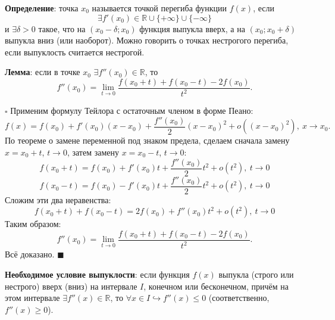 \documentclass[12pt, a4paper, reqno]{article}
\begin{document}
    \textbf{Определение}: точка $x_0$ называется точкой перегиба функции $f(x)$, если
    \begin{equation*}
        \exists f'(x_0)\in\mathbb{R}\cup\{+\infty\}\cup\{-\infty\}
    \end{equation*}
    и $\exists\delta > 0$ такое, что на $(x_0 - \delta; x_0)$ функция выпукла вверх, а на
    $(x_0; x_0 + \delta)$ выпукла вниз (или наоборот). Можно говорить о точках нестрогого перегиба,
    если выпуклость считается нестрогой.

    \textbf{Лемма}: если в точке $x_0$ $\exists f''(x_0)\in\mathbb{R}$, то
    \begin{equation*}
        f''(x_0) = \lim\limits_{t\to 0} \dfrac{f(x_0 + t) + f(x_0 - t) - 2f(x_0)}{t^2}.
    \end{equation*}

    $\square$ Применим формулу Тейлора с остаточным членом в форме Пеано:
    \begin{equation*}
        f(x) = f(x_0) + f'(x_0)(x - x_0) + \dfrac{f''(x_0)}{2}(x - x_0)^2 + o\left((x - x_0)^2\right),\
        x\to x_0.
    \end{equation*}
    По теореме о замене переменной под знаком предела, сделаем сначала замену $x = x_0 + t$,
    $t\to 0$, затем замену $x = x_0 - t$, $t\to 0$:
    \begin{equation*}
        f(x_0 + t) = f(x_0) + f'(x_0)t + \dfrac{f''(x_0)}{2}t^2 + o(t^2),\ t\to 0
    \end{equation*}
    \begin{equation*}
        f(x_0 - t) = f(x_0) - f'(x_0)t + \dfrac{f''(x_0)}{2}t^2 + o(t^2),\ t\to 0
    \end{equation*}
    Сложим эти два неравенства:
    \begin{equation*}
        f(x_0 + t) + f(x_0 - t) = 2f(x_0) + f''(x_0)t^2 + o(t^2),\ t\to 0
    \end{equation*}
    Таким образом:
    \begin{equation*}
        f''(x_0) = \lim\limits_{t\to 0} \dfrac{f(x_0 + t) + f(x_0 - t) - 2f(x_0)}{t^2}.
    \end{equation*}
    Всё доказано. $\blacksquare$

    \textbf{Необходимое условие выпуклости}: если функция $f(x)$ выпукла (строго или нестрого) вверх
    (вниз) на интервале $I$, конечном или бесконечном, причём на этом интервале
    $\exists f''(x)\in\mathbb{R}$, то $\forall x\in I\hookrightarrow f''(x) \leq 0$ (соответственно,
    $f''(x) \geq 0$).
\end{document}
